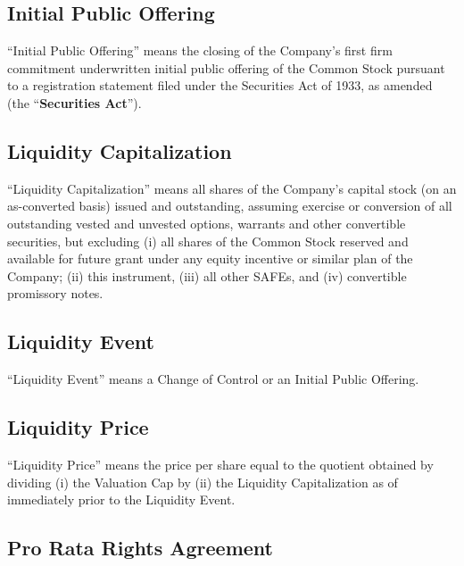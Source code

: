 \documentclass[12pt,letterpaper,fullpage]{article}
\begin{document}
\subsection{Initial Public Offering}
\label{sec:initialpublicoffering}

“Initial Public Offering” means the closing of the Company’s first
firm commitment underwritten initial public offering of the Common
Stock pursuant to a registration statement filed under the Securities
Act of 1933, as amended (the “\textbf{Securities Act}”).

\subsection{Liquidity Capitalization}
\label{sec:liquiditycapitalization}

\begin{sloppypar}
“Liquidity Capitalization” means all shares of the Company’s capital
stock (on an as-converted basis) issued and outstanding, assuming
exercise or conversion of all outstanding vested and unvested options,
warrants and other convertible securities, but excluding (i) all
shares of the Common Stock reserved and available for future grant
under any equity incentive or similar plan of the Company; (ii) this
instrument, (iii) all other SAFEs, and (iv) convertible promissory
notes.
\end{sloppypar}

\subsection{Liquidity Event}
\label{sec:liquidityeventdef}

“Liquidity Event” means a Change of Control or an Initial Public Offering.

\subsection{Liquidity Price}
\label{sec:liquidityprice}

“Liquidity Price” means the price per share equal to the quotient
obtained by dividing (i) the Valuation Cap by (ii) the Liquidity
Capitalization as of immediately prior to the Liquidity Event.

\subsection{Pro Rata Rights Agreement}
\label{sec:proratarights}
\end{document}
